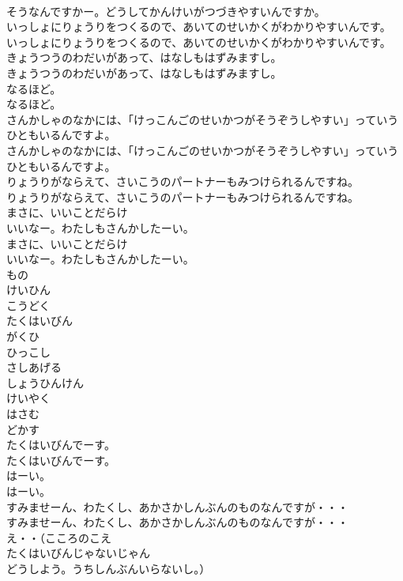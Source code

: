 \documentclass[8pt]{extreport}
\begin{document}
\begin{CJK}{UTF8}{min}
\\	そうなんですかー。どうしてかんけいがつづきやすいんですか。
\\	いっしょにりょうりをつくるので、あいてのせいかくがわかりやすいんです。
\\	いっしょにりょうりをつくるので、あいてのせいかくがわかりやすいんです。
\\	きょうつうのわだいがあって、はなしもはずみますし。
\\	きょうつうのわだいがあって、はなしもはずみますし。
\\	なるほど。
\\	なるほど。
\\	さんかしゃのなかには、「けっこんごのせいかつがそうぞうしやすい」っていうひともいるんですよ。
\\	さんかしゃのなかには、「けっこんごのせいかつがそうぞうしやすい」っていうひともいるんですよ。
\\	りょうりがならえて、さいこうのパートナーもみつけられるんですね。
\\	りょうりがならえて、さいこうのパートナーもみつけられるんですね。
\\	まさに、いいことだらけ
\\	いいなー。わたしもさんかしたーい。
\\	まさに、いいことだらけ
\\	いいなー。わたしもさんかしたーい。
\\	もの
\\	けいひん
\\	こうどく
\\	たくはいびん
\\	がくひ
\\	ひっこし
\\	さしあげる
\\	しょうひんけん
\\	けいやく
\\	はさむ
\\	どかす
\\	たくはいびんでーす。
\\	たくはいびんでーす。
\\	はーい。
\\	はーい。
\\	すみませーん、わたくし、あかさかしんぶんのものなんですが・・・
\\	すみませーん、わたくし、あかさかしんぶんのものなんですが・・・
\\	え・・（こころのこえ
\\	たくはいびんじゃないじゃん
\\	どうしよう。うちしんぶんいらないし。）

\end{CJK}
\end{document}
